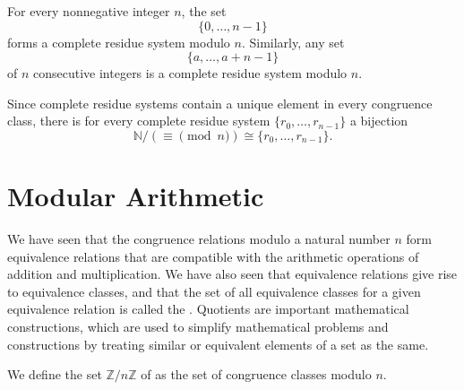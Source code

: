 \begin{example}
  For every nonnegative integer $n$, the set
  \begin{equation*}
    \{0,\ldots,n-1\}
  \end{equation*}
  forms a complete residue system modulo $n$. Similarly, any set
  \begin{equation*}
    \{a,\ldots,a+n-1\}
  \end{equation*}
  of $n$ consecutive integers is a complete residue system modulo $n$.
\end{example}

\begin{remark}
  Since complete residue systems contain a unique element in every congruence class, there is for every complete residue system $\{r_0,\ldots,r_{n-1}\}$ a bijection
  \begin{equation*}
    \mathbb{N}/{({\equiv}\pmod{n})} \cong \{r_0,\ldots,r_{n-1}\}.
  \end{equation*}
\end{remark}

\section{Modular Arithmetic}

We have seen that the congruence relations modulo a natural number $n$ form equivalence relations that are compatible with the arithmetic operations of addition and multiplication. We have also seen that equivalence relations give rise to equivalence classes, and that the set of all equivalence classes for a given equivalence relation is called the . Quotients are important mathematical constructions, which are used to simplify mathematical problems and constructions by treating similar or equivalent elements of a set as the same.

\begin{definition}
  We define the set $\mathbb{Z}/n\mathbb{Z}$ of  as the set of congruence classes modulo $n$.
\end{definition}

